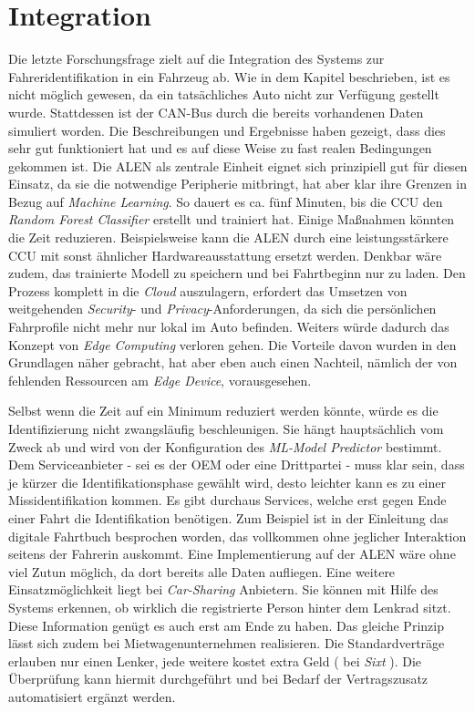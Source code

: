\section{Integration}

Die letzte Forschungsfrage zielt auf die Integration des Systems zur Fahreridentifikation in ein Fahrzeug ab. Wie in dem Kapitel beschrieben, ist es nicht möglich gewesen, da ein tatsächliches Auto nicht zur Verfügung gestellt wurde. Stattdessen ist der CAN-Bus durch die bereits vorhandenen Daten simuliert worden. Die Beschreibungen und Ergebnisse haben gezeigt, dass dies sehr gut funktioniert hat und es auf diese Weise zu fast realen Bedingungen gekommen ist. Die ALEN als zentrale Einheit eignet sich prinzipiell gut für diesen Einsatz, da sie die notwendige Peripherie mitbringt, hat aber klar ihre Grenzen in Bezug auf \textit{Machine Learning}. So dauert es ca. fünf Minuten, bis die CCU den \textit{Random Forest Classifier} erstellt und trainiert hat. Einige Maßnahmen könnten die Zeit reduzieren. Beispielsweise kann die ALEN durch eine leistungsstärkere CCU mit sonst ähnlicher Hardwareausstattung ersetzt werden. Denkbar wäre zudem, das trainierte Modell zu speichern und bei Fahrtbeginn nur zu laden. Den Prozess komplett in die \textit{Cloud} auszulagern, erfordert das Umsetzen von weitgehenden \textit{Security}- und \textit{Privacy}-Anforderungen, da sich die persönlichen Fahrprofile nicht mehr nur lokal im Auto befinden. Weiters würde dadurch das Konzept von \textit{Edge Computing} verloren gehen. Die Vorteile davon wurden in den Grundlagen näher gebracht, hat aber eben auch einen Nachteil, nämlich der von fehlenden Ressourcen am \textit{Edge Device}, vorausgesehen.

Selbst wenn die Zeit auf ein Minimum reduziert werden könnte, würde es die Identifizierung nicht zwangsläufig beschleunigen. Sie hängt hauptsächlich vom Zweck ab und wird von der Konfiguration des \textit{ML-Model Predictor} bestimmt. Dem Serviceanbieter - sei es der OEM oder eine Drittpartei - muss klar sein, dass je kürzer die Identifikationsphase gewählt wird, desto leichter kann es zu einer Missidentifikation kommen. Es gibt durchaus Services, welche erst gegen Ende einer Fahrt die Identifikation benötigen. Zum Beispiel ist in der Einleitung das digitale Fahrtbuch besprochen worden, das vollkommen ohne jeglicher Interaktion seitens der Fahrerin auskommt. Eine Implementierung auf der ALEN wäre ohne viel Zutun möglich, da dort bereits alle Daten aufliegen. Eine weitere Einsatzmöglichkeit liegt bei \textit{Car-Sharing} Anbietern. Sie können mit Hilfe des Systems erkennen, ob wirklich die registrierte Person hinter dem Lenkrad sitzt. Diese Information genügt es auch erst am Ende zu haben. Das gleiche Prinzip lässt sich zudem bei Mietwagenunternehmen realisieren. Die Standardverträge erlauben nur einen Lenker, jede weitere kostet extra Geld ( bei \textit{Sixt} \cite{SIXT}). Die Überprüfung kann hiermit durchgeführt und bei Bedarf der Vertragszusatz automatisiert ergänzt werden.

